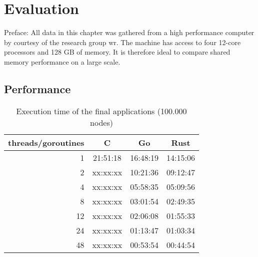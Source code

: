 \chapter{Evaluation}
\label{ch:Evaluation}


Preface: All data in this chapter was gathered from a high performance computer by courtesy of the research group \gls{wr}. The machine has access to four 12-core processors and 128 GB of memory. It is therefore ideal to compare shared memory performance on a large scale.

\section{Performance}
\label{sec:Evaluaton::Performance}

\begin{table}[htb]
    \centering
    \begin{tabular}{rccc}
        \toprule
            threads/goroutines
            & C
            & Go
            & Rust \\
        \midrule

            1
            & 21:51:18
            & 16:48:19
            & 14:15:06 \\

            2
            & xx:xx:xx
            & 10:21:36
            & 09:12:47 \\

            4
            & xx:xx:xx
            & 05:58:35
            & 05:09:56 \\

            8
            & xx:xx:xx
            & 03:01:54
            & 02:49:35 \\

            12
            & xx:xx:xx
            & 02:06:08
            & 01:55:33 \\

            24
            & xx:xx:xx
            & 01:13:47
            & 01:03:34 \\

            48
            & xx:xx:xx
            & 00:53:54
            & 00:44:54 \\

        \bottomrule
    \end{tabular}
    \caption{Execution time of the final applications (100.000 nodes)}
    \label{tb:final_execution_time}
\end{table}

